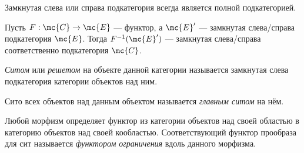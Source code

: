 \documentclass[
	extrafontsizes,
	11pt,
	hyphens,
]{memoir}
\begin{document}

\begin{observation}
Замкнутая слева или справа подкатегория всегда является полной подкатегорией.
\end{observation}


\begin{observation}
Пусть \(F : \mc{C} \to \mc{E}\) --- функтор, а \(\mc{E}'\) --- замкнутая слева/справа подкатегория \(\mc{E}\).
Тогда \(F^{-1}(\mc{E}')\) --- замкнутая слева/справа соответственно подкатегория \(\mc{C}\).
\end{observation}

\begin{definition}
\emph{Ситом} или \emph{решетом} на объекте данной категории называется замкнутая слева подкатегория категории объектов над ним.
\end{definition}

\begin{definition}
Сито всех объектов над данным объектом называется \emph{главным ситом} на нём.
\end{definition}


\begin{definition}
Любой морфизм определяет функтор из категории объектов над своей областью в категорию объектов над своей кообластью. Соответствующий функтор прообраза для сит называется \emph{функтором ограничения} вдоль данного морфизма.
\end{definition}
\end{document}
